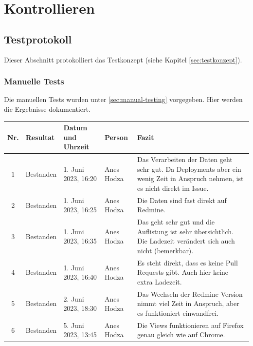 \chapter{Kontrollieren}

\section{Testprotokoll}
Dieser Abschnitt protokolliert das Testkonzept (siehe Kapitel \ref{sec:testkonzept}).
\subsection{Manuelle Tests}
\label{sec:manual-tests}
Die manuellen Tests wurden unter \ref{sec:manual-testing} vorgegeben. Hier werden die Ergebnisse
dokumentiert.
\begin{tabularx}{\textwidth}[H]{|c|X|X|X|X|}
    \hline
    \textbf{Nr.} & \textbf{Resultat} & \textbf{Datum und Uhrzeit} & \textbf{Person} & \textbf{Fazit} \\ \hline
    1 & Bestanden & 1. Juni 2023, 16:20 & Anes Hodza & Das Verarbeiten der Daten geht sehr gut. Da Deployments
    aber ein wenig Zeit in Anspruch nehmen, ist es nicht direkt im Issue. \\ \hline
    2 & Bestanden & 1. Juni 2023, 16:25 & Anes Hodza & Die Daten sind fast direkt auf Redmine. \\ \hline
    3 & Bestanden & 1. Juni 2023, 16:35 & Anes Hodza & Das geht sehr gut und die Auflistung ist sehr
    übersichtlich. Die Ladezeit verändert sich auch nicht (bemerkbar). \\ \hline
    4 & Bestanden & 1. Juni 2023, 16:40 & Anes Hodza & Es steht direkt, dass es keine Pull Requests gibt. 
    Auch hier keine extra Ladezeit. \\ \hline
    5 & Bestanden & 2. Juni 2023, 18:30 & Anes Hodza & Das Wechseln der Redmine Version nimmt viel Zeit in 
    Anspruch, aber es funktioniert einwandfrei. \\ \hline
    6 & Bestanden & 5. Juni 2023, 13:45 & Anes Hodza & Die Views funktionieren auf Firefox genau gleich wie
    auf Chrome. \\ \hline
\end{tabularx}

